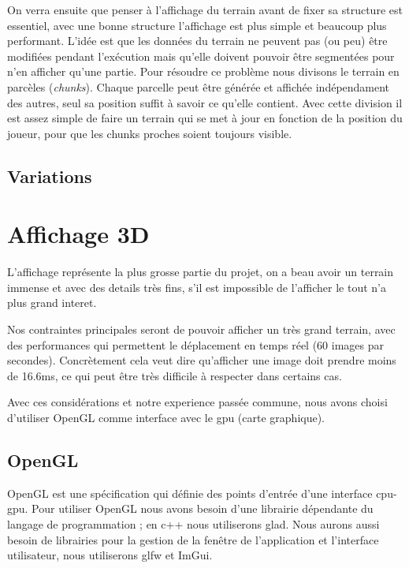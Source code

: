 \documentclass[11pt]{article} %
\begin{document}
On verra ensuite que penser à l'affichage du terrain avant de fixer sa structure est essentiel, avec une bonne structure l'affichage est plus simple et beaucoup plus performant. L'idée est que les données du terrain ne peuvent pas (ou peu) être modifiées pendant l'exécution mais qu'elle doivent pouvoir être segmentées pour n'en afficher qu'une partie.
Pour résoudre ce problème nous divisons le terrain en parcèles (\textit{chunks}). Chaque parcelle peut être générée et affichée indépendament des autres, seul sa position suffit à savoir ce qu'elle contient.
Avec cette division il est assez simple de faire un terrain qui se met à jour en fonction de la position du joueur, pour que les chunks proches soient toujours visible.




\subsection{Variations}





\section{Affichage 3D}

L'affichage représente la plus grosse partie du projet, on a beau avoir un terrain immense et avec des details très fins, s'il est impossible de l'afficher le tout n'a plus grand interet.

Nos contraintes principales seront de pouvoir afficher un très grand terrain, avec des performances qui permettent le déplacement en temps réel (60 images par secondes). Concrètement cela veut dire qu'afficher une image doit prendre moins de 16.6ms, ce qui peut être très difficile à respecter dans certains cas.

Avec ces considérations et notre experience passée commune, nous avons choisi d'utiliser OpenGL comme interface avec le gpu (carte graphique).

\subsection{OpenGL}

OpenGL est une spécification qui définie des points d'entrée d'une interface cpu-gpu. Pour utiliser OpenGL nous avons besoin d'une librairie dépendante du langage de programmation ; en c++ nous utiliserons glad. Nous aurons aussi besoin de librairies pour la gestion de la fenêtre de l'application et l'interface utilisateur, nous utiliserons glfw et ImGui.
\end{document}
